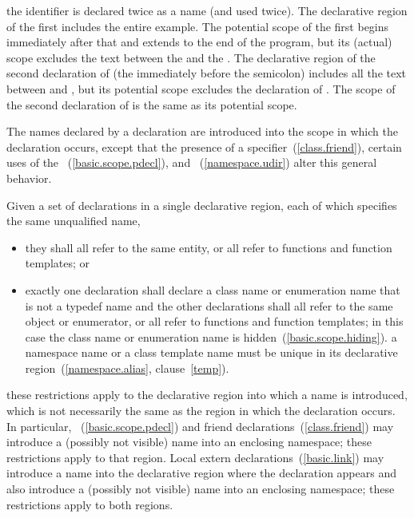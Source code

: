 the identifier  is declared twice as a name (and used twice).
The declarative region of the first  includes the entire
example. The potential scope of the first  begins immediately
after that  and extends to the end of the program, but its
(actual) scope excludes the text between the \tcode{,} and the
\tcode{\}}. The declarative region of the second declaration of
 (the  immediately before the semicolon) includes all
the text between \tcode{\{} and \tcode{\}}, but its potential scope
excludes the declaration of . The scope of the second
declaration of  is the same as its potential scope.
\exitexample

\pnum
The names declared by a declaration are introduced into the scope in
which the declaration occurs, except that the presence of a
 specifier~(\ref{class.friend}), certain uses of the
~(\ref{basic.scope.pdecl}), and
~(\ref{namespace.udir}) alter this general
behavior.

\pnum
Given a set of declarations in a single declarative region, each of
which specifies the same unqualified name,

\begin{itemize}
\item they shall all refer to the same entity, or all refer to functions
and function templates; or
\item exactly one declaration shall declare a class name or enumeration
name that is not a typedef name and the other declarations shall all
refer to the same object or enumerator, or all refer to functions and
function templates; in this case the class name or enumeration name is
hidden~(\ref{basic.scope.hiding}). \enternote a namespace name or a
class template name must be unique in its declarative
region~(\ref{namespace.alias}, clause~\ref{temp}). \exitnote
\end{itemize}
\enternote these restrictions apply to the declarative region into which
a name is introduced, which is not necessarily the same as the region in
which the declaration occurs. In particular,
~(\ref{basic.scope.pdecl}) and
friend declarations~(\ref{class.friend}) may introduce a (possibly not
visible) name into an enclosing namespace; these restrictions apply to
that region. Local extern declarations~(\ref{basic.link}) may introduce
a name into the declarative region where the declaration appears and
also introduce a (possibly not visible) name into an enclosing
namespace; these restrictions apply to both regions. \exitnote

